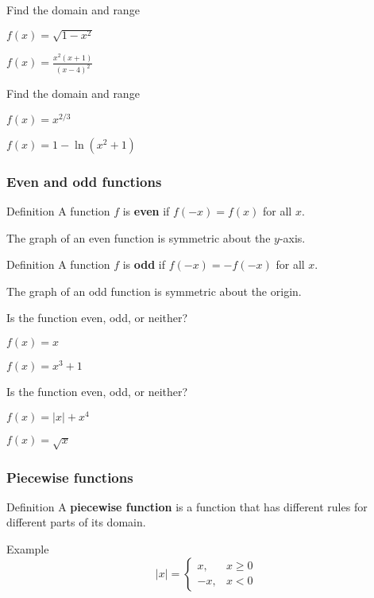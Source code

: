 \documentclass[t]{beamer}
\newenvironment{fpi}
  {\itemize[nolistsep,itemsep=\fill]}
  {\vfill\enditemize}
\begin{document}
\begin{frame}{Find the domain and range}
\begin{fpi}
\item $\displaystyle f(x) = \sqrt{1 - x^2}$
\item $\displaystyle f(x) = \frac{x^2(x+1)}{(x-4)^2}$
\end{fpi}
\end{frame}

\begin{frame}{Find the domain and range}
\begin{fpi}
\item $\displaystyle f(x) = x^{2/3}$
\item $\displaystyle f(x) = 1 - \ln(x^2 + 1)$
\end{fpi}
\end{frame}


\begin{frame}
\frametitle{Even and odd functions}
\begin{block}{Definition}
A function $f$ is \textbf{even} if $f(-x) = f(x)$ for all $x$.
\end{block}
The graph of an even function is symmetric about the $y$-axis.
\begin{block}{Definition}
A function $f$ is \textbf{odd} if $f(-x) = -f(-x)$ for all $x$.
\end{block}
The graph of an odd function is symmetric about the origin.
\end{frame}

\begin{frame}{Is the function even, odd, or neither?}
\begin{fpi}
\item $\displaystyle f(x) = x$
\item $\displaystyle f(x) = x^3 + 1$
\end{fpi}
\end{frame}

\begin{frame}{Is the function even, odd, or neither?}
\begin{fpi}
\item $\displaystyle f(x) = |x| + x^4$
\item $\displaystyle f(x) = \sqrt{x}$
\end{fpi}
\end{frame}


\begin{frame}
\frametitle{Piecewise functions}
\begin{block}{Definition}
A \textbf{piecewise function} is a function that has different rules for different parts of its domain.
\end{block}
\begin{block}{Example}
$$
|x| = \begin{cases}
x, & x \ge 0 \\
-x, &  x < 0
\end{cases}
$$
\end{block}
\end{frame}
\end{document}
